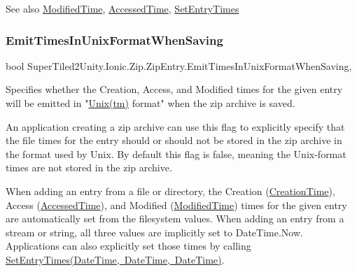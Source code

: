 \begin{DoxySeeAlso}{See also}
\mbox{\hyperlink{class_super_tiled2_unity_1_1_ionic_1_1_zip_1_1_zip_entry_a88021d72ea8b94c762388d92d74c2e0d}{Modified\+Time}}, \mbox{\hyperlink{class_super_tiled2_unity_1_1_ionic_1_1_zip_1_1_zip_entry_abc1a038c251f1ed0e2c1435a5bab23fd}{Accessed\+Time}}, \mbox{\hyperlink{class_super_tiled2_unity_1_1_ionic_1_1_zip_1_1_zip_entry_a7331ca69b05c476a9d321b30d7649766}{Set\+Entry\+Times}}


\end{DoxySeeAlso}
\mbox{\label{class_super_tiled2_unity_1_1_ionic_1_1_zip_1_1_zip_entry_afd50bda347e67681780f32ebdba43f58}} 
\subsubsection{\texorpdfstring{Emit\+Times\+In\+Unix\+Format\+When\+Saving}{EmitTimesInUnixFormatWhenSaving}}
{\footnotesize\ttfamily bool Super\+Tiled2\+Unity.\+Ionic.\+Zip.\+Zip\+Entry.\+Emit\+Times\+In\+Unix\+Format\+When\+Saving\hspace{0.3cm}{\ttfamily [get]}, {\ttfamily [set]}}



Specifies whether the Creation, Access, and Modified times for the given entry will be emitted in "\mbox{\hyperlink{namespace_super_tiled2_unity_1_1_ionic_1_1_zip_afa5034d6b4915c0633b590a28622f7fda6ec1bd1ea6a5d67a63b20c8f6172bddd}{Unix(tm)}} format" when the zip archive is saved. 

An application creating a zip archive can use this flag to explicitly specify that the file times for the entry should or should not be stored in the zip archive in the format used by Unix. By default this flag is {\ttfamily false}, meaning the Unix-\/format times are not stored in the zip archive. 

When adding an entry from a file or directory, the Creation (\mbox{\hyperlink{class_super_tiled2_unity_1_1_ionic_1_1_zip_1_1_zip_entry_a38ef2ae810c3b89b1f23ebea918fb60e}{Creation\+Time}}), Access (\mbox{\hyperlink{class_super_tiled2_unity_1_1_ionic_1_1_zip_1_1_zip_entry_abc1a038c251f1ed0e2c1435a5bab23fd}{Accessed\+Time}}), and Modified (\mbox{\hyperlink{class_super_tiled2_unity_1_1_ionic_1_1_zip_1_1_zip_entry_a88021d72ea8b94c762388d92d74c2e0d}{Modified\+Time}}) times for the given entry are automatically set from the filesystem values. When adding an entry from a stream or string, all three values are implicitly set to Date\+Time.\+Now. Applications can also explicitly set those times by calling \mbox{\hyperlink{class_super_tiled2_unity_1_1_ionic_1_1_zip_1_1_zip_entry_a7331ca69b05c476a9d321b30d7649766}{Set\+Entry\+Times(\+Date\+Time, Date\+Time, Date\+Time)}}. 

